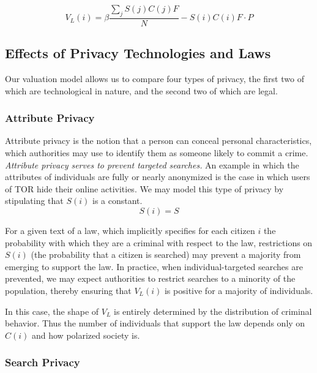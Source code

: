$$V_L(i) = \beta \frac{\sum_j S(j)C(j)F}{N} - S(i)C(i)F\cdot P$$


\subsection{Effects of Privacy Technologies and Laws}
Our valuation model allows us to compare four types of privacy, the first two of which are technological in nature, and the second  two of which are legal.

\subsubsection{Attribute Privacy}

Attribute privacy is the notion that a person can conceal personal characteristics, which authorities may use to identify them as someone likely to commit a crime. \emph{Attribute privacy serves to prevent targeted searches.}  An example in which the attributes of individuals are fully or nearly anonymized is the case in which users of TOR hide their online activities. We may model this type of privacy by stipulating that $S(i)$ is a constant.
$$S(i)=S$$

For a given text of a law, which implicitly specifies for each citizen $i$ the probability with which they are a criminal with respect to the law, restrictions on $S(i)$ (the probability that a citizen is searched) may prevent a majority from emerging to support the law.  %
 In practice, when individual-targeted searches are prevented, we may expect authorities to restrict searches to a minority of the population, thereby ensuring that $V_L(i)$ is positive for a majority of individuals.

In this case, the shape of $V_L$ is entirely determined by the distribution of criminal behavior. Thus the number of individuals that support the law depends only on $C(i)$ and how polarized society is.

\subsubsection{Search Privacy}

